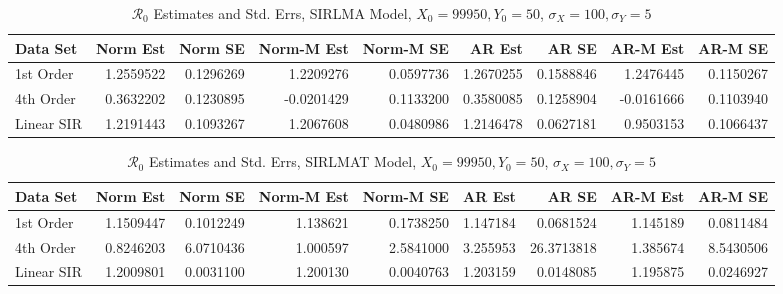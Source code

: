 \documentclass[12pt]{article}
\newcommand{\rr}{\ensuremath{\mathcal{R}_0}}
\begin{document}
\begin{table}[H]
	
	\caption{\label{tab:}$\rr$ Estimates and Std. Errs, SIRLMA Model,
		$X_0 = 99950, Y_0 = 50$, $\sigma_X = 100, \sigma_Y = 5$}
	\centering
	\begin{footnotesize}
	\begin{tabular}[t]{l|r|r|r|r|r|r|r|r}
		\hline
		Data Set & Norm Est & Norm SE & Norm-M Est & Norm-M SE & AR Est & AR SE & AR-M Est & AR-M SE\\
		\hline
		1st Order & 1.2559522 & 0.1296269 & 1.2209276 & 0.0597736 & 1.2670255 & 0.1588846 & 1.2476445 & 0.1150267\\
		\hline
		4th Order & 0.3632202 & 0.1230895 & -0.0201429 & 0.1133200 & 0.3580085 & 0.1258904 & -0.0161666 & 0.1103940\\
		\hline
		Linear SIR & 1.2191443 & 0.1093267 & 1.2067608 & 0.0480986 & 1.2146478 & 0.0627181 & 0.9503153 & 0.1066437\\
		\hline
	\end{tabular}
\end{footnotesize}
\end{table}
\begin{table}[H]
	
	\caption{\label{tab:}$\rr$ Estimates and Std. Errs, SIRLMAT Model,
		$X_0 = 99950, Y_0 = 50$, $\sigma_X = 100, \sigma_Y = 5$}
	\centering
	\begin{footnotesize}
	\begin{tabular}[t]{l|r|r|r|r|r|r|r|r}
		\hline
		Data Set & Norm Est & Norm SE & Norm-M Est & Norm-M SE & AR Est & AR SE & AR-M Est & AR-M SE\\
		\hline
		1st Order & 1.1509447 & 0.1012249 & 1.138621 & 0.1738250 & 1.147184 & 0.0681524 & 1.145189 & 0.0811484\\
		\hline
		4th Order & 0.8246203 & 6.0710436 & 1.000597 & 2.5841000 & 3.255953 & 26.3713818 & 1.385674 & 8.5430506\\
		\hline
		Linear SIR & 1.2009801 & 0.0031100 & 1.200130 & 0.0040763 & 1.203159 & 0.0148085 & 1.195875 & 0.0246927\\
		\hline
	\end{tabular}
\end{footnotesize}
\end{table}
\end{document}
